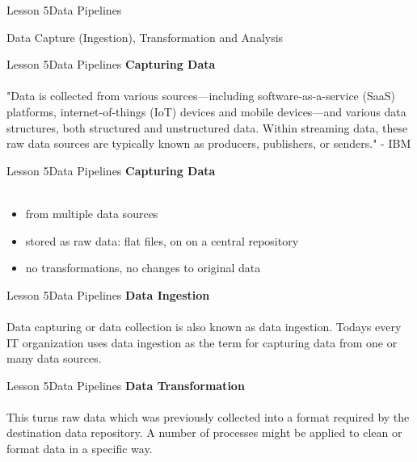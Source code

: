 \documentclass[aspectratio=1610]{beamer}
\begin{document}
\begin{frame}{Lesson 5}{Data Pipelines}
\Huge
\begin{center}
Data Capture (Ingestion), Transformation and Analysis
\end{center}
\end{frame}


\begin{frame}{Lesson 5}{Data Pipelines}
\LARGE
\textbf{Capturing Data}\\~\\
"Data is collected from various sources—including software-as-a-service (SaaS) 
platforms, internet-of-things (IoT) devices and mobile devices—and various data 
structures, both structured and unstructured data. Within streaming data, these 
raw data sources are typically known as producers, publishers, or senders." -
IBM 
\end{frame}


\begin{frame}{Lesson 5}{Data Pipelines}
\LARGE
\textbf{Capturing Data}\\~\\
\begin{itemize}
    \item from multiple data sources
    \item stored as raw data: flat files, on on a central repository
    \item no transformations, no changes to original data
\end{itemize}
\end{frame}


\begin{frame}{Lesson 5}{Data Pipelines}
\LARGE
\textbf{Data Ingestion}\\~\\
Data capturing or data collection is also known as data ingestion. Todays every 
IT organization uses data ingestion as the term for capturing data from one or 
many data sources. 
\end{frame}



\begin{frame}{Lesson 5}{Data Pipelines}
\LARGE
\textbf{Data Transformation}\\~\\
This turns raw data which was previously collected into a format required by 
the destination data repository. A number of processes might be applied to 
clean or format data in a specific way.
\end{frame}
\end{document}
